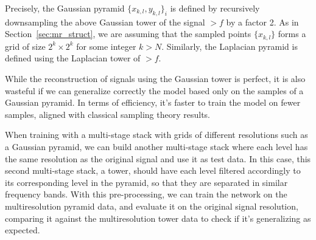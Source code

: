 Precisely, the Gaussian pyramid $\{x_{k,l}, y_{k,l}\}_i$ is defined by recursively downsampling the above Gaussian tower of the signal $\gt{f}$ by a factor 2.
As in Section~\ref{sec:mr_struct}, we are assuming that the sampled points $\{x_{k,l}\}$ forms a grid of size $2^k\times 2^k$ for some integer $k>N$.
Similarly, the Laplacian pyramid is defined using the Laplacian tower of $\gt{f}$. 

While the reconstruction of signals using the Gaussian tower is perfect, it is also wasteful if we can generalize correctly the model based only on the samples of a Gaussian pyramid. In terms of efficiency, it's faster to train the model on fewer samples, aligned with classical sampling theory results. 


When training with a multi-stage stack with grids of different resolutions such as a Gaussian pyramid, we can build another multi-stage stack where each level has the same resolution as the original signal and use it as test data. In this case, this second multi-stage stack, a tower, should have each level filtered accordingly to its corresponding level in the pyramid, so that they are separated in similar frequency bands. With this pre-processing, we can train the network on the multiresolution pyramid data, and evaluate it on the original signal resolution, comparing it against the multiresolution tower data to check if it's generalizing as expected.


